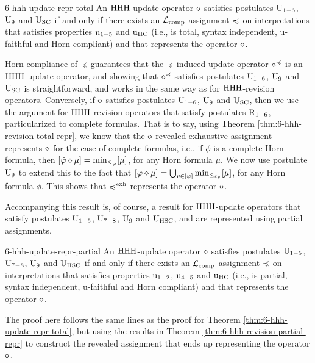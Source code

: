 \begin{thm}{}{6-hhh-update-repr-total}
	An ${\mathrm{HHH}}$-update operator $\diamond$ 
	satisfies postulates $\mathrm{U}_{1-6}$, $\mathrm{U}_{9}$ and $\mathrm{U}_{{\mathrm{SC}}}$
	if and only if there exists
	an $\mathcal{L}_{{\operatorname{comp}}}$-assignment $\preccurlyeq$ on interpretations
	that satisfies properties $\mathrm{u}_{1-5}$ and $\mathrm{u}_{\mathrm{HC}}$
	(i.e., is total, syntax independent, u-faithful and Horn compliant)
	and that represents the operator $\diamond$.
\end{thm}
\begin{prf*}{}{}%
	Horn compliance of $\preccurlyeq$ guarantees that the $\preccurlyeq$-induced update operator $\diamond^{\preccurlyeq}$ 
	is an ${\mathrm{HHH}}$-update operator, and showing that $\diamond^{\preccurlyeq}$ satisfies postulates 
	$\mathrm{U}_{1-6}$, $\mathrm{U}_{9}$ and $\mathrm{U}_{{\mathrm{SC}}}$ is straightforward, and works in the same way 
	as for ${\mathrm{HHH}}$-revision operators.
	Conversely, if $\diamond$ satisfies postulates $\mathrm{U}_{1-6}$, $\mathrm{U}_{9}$ and $\mathrm{U}_{{\mathrm{SC}}}$,
	then we use the argument for ${\mathrm{HHH}}$-revision operators that satisfy postulates $\mathrm{R}_{1-6}$,
	particularized to complete formulas.
	That is to say, using Theorem \ref{thm:6-hhh-revision-total-repr},
	we know that the $\diamond$-revealed exhaustive assignment represents $\diamond$ for the case of complete formulas,
	i.e., if $\dot{\phi}$ is a complete Horn formula,
	then $[\dot{\varphi}\diamond\mu]={\operatorname{min}}_{\le_{\dot{\varphi}}}[\mu]$, for any Horn formula $\mu$.
	We now use postulate $\mathrm{U}_{9}$ to extend this to the fact that 
	$[\varphi\diamond\mu]=\bigcup_{v\in[\varphi]}{\operatorname{min}}_{\le_{\varepsilon_{v}}}[\mu]$,
	for any Horn formula $\phi$.
	This shows that $\preccurlyeq^{{\operatorname{exh}}}$ represents the operator $\diamond$.
\end{prf*}

Accompanying this result is, of course, a result for 
${\mathrm{HHH}}$-update operators that satisfy postulates $\mathrm{U}_{1-5}$, $\mathrm{U}_{7-8}$, $\mathrm{U}_{9}$
and $\mathrm{U}_{{\mathrm{HSC}}}$, and are represented using partial assignments.

\begin{thm}{}{6-hhh-update-repr-partial}
	An ${\mathrm{HHH}}$-update operator $\diamond$ 
	satisfies postulates $\mathrm{U}_{1-5}$, $\mathrm{U}_{7-8}$, $\mathrm{U}_{9}$ and $\mathrm{U}_{{\mathrm{HSC}}}$
	if and only if there exists
	an $\mathcal{L}_{{\operatorname{comp}}}$-assignment $\preccurlyeq$ on interpretations
	that satisfies properties $\mathrm{u}_{1-2}$, $\mathrm{u}_{4-5}$ and $\mathrm{u}_{\mathrm{HC}}$
	(i.e., is partial, syntax independent, u-faithful and Horn compliant)
	and that represents the operator $\diamond$.
\end{thm}
\begin{prf*}{}{}%
	The proof here follows the same lines as the proof for Theorem \ref{thm:6-hhh-update-repr-total},
	but using the results in Theorem \ref{thm:6-hhh-revision-partial-repr} to construct the 
	revealed assignment that ends up representing the operator $\diamond$.
\end{prf*}

